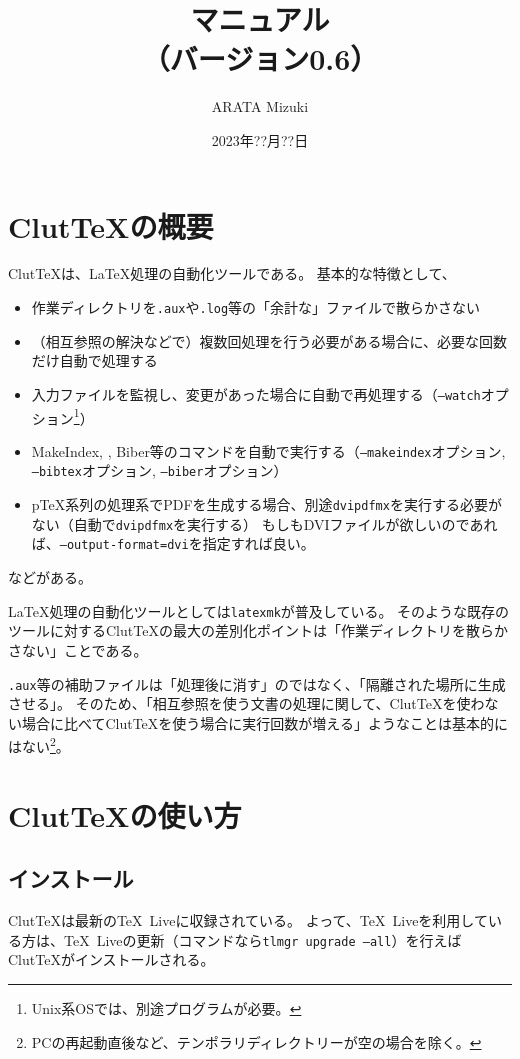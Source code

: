 \documentclass[a4paper]{ltjsreport}
\title{\ClutTeX{}マニュアル\\（バージョン0.6）}
\author{ARATA Mizuki}
\date{2023年??月??日}
\newcommand\ClutTeX{Clut\TeX}
\begin{document}
\maketitle
\tableofcontents

\chapter{\ClutTeX{}の概要}
\ClutTeX{}は、\LaTeX{}処理の自動化ツールである。
基本的な特徴として、
\begin{itemize}
\item 作業ディレクトリを\texttt{.aux}や\texttt{.log}等の「余計な」ファイルで散らかさない
\item （相互参照の解決などで）複数回処理を行う必要がある場合に、必要な回数だけ自動で処理する
\item 入力ファイルを監視し、変更があった場合に自動で再処理する（\texttt{--watch}オプション\footnote{Unix系OSでは、別途プログラムが必要。}）
\item MakeIndex, \BibTeX, Biber等のコマンドを自動で実行する（\texttt{--makeindex}オプション, \texttt{--bibtex}オプション, \texttt{--biber}オプション）
\item p\TeX 系列の処理系でPDFを生成する場合、別途\texttt{dvipdfmx}を実行する必要がない（自動で\texttt{dvipdfmx}を実行する）
  もしもDVIファイルが欲しいのであれば、\texttt{--output-format=dvi}を指定すれば良い。
\end{itemize}
などがある。

\LaTeX{}処理の自動化ツールとしては\texttt{latexmk}が普及している。
そのような既存のツールに対する\ClutTeX{}の最大の差別化ポイントは「作業ディレクトリを散らかさない」ことである。

\texttt{.aux}等の補助ファイルは「処理後に消す」のではなく、「隔離された場所に生成させる」。
そのため、「相互参照を使う文書の処理に関して、\ClutTeX{}を使わない場合に比べて\ClutTeX{}を使う場合に実行回数が増える」ようなことは基本的にはない\footnote{PCの再起動直後など、テンポラリディレクトリーが空の場合を除く。}。

\chapter{\ClutTeX{}の使い方}
\section{インストール}
\ClutTeX{}は最新の\TeX\ Liveに収録されている。
よって、\TeX\ Liveを利用している方は、\TeX\ Liveの更新（コマンドなら\texttt{tlmgr upgrade --all}）を行えば\ClutTeX{}がインストールされる。
\end{document}
